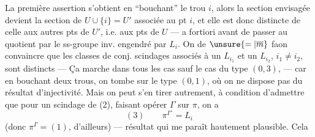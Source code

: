 La première assertion s'obtient en ``bouchant''
le trou $i$, alors la section envisagée devient
la section de $U\cup\{i\}=U'$ associée au pt $i$,
et elle est donc distincte de celle 
aux  autres pts de $U'$, i.e. aux pts de
$U$ --- a fortiori avant de passer au
quotient par le ss-groupe inv. engendré
par $L_i$. On  de $\unsure{=|\overline m}$ faon 
convaincre que les classes de conj. 
scindages associés à un $L_{i_1}$ et un $L_{i_2}$, $i_1\ne i_2$,
sont distincts --- Ça marche dans tous les
cas sauf le cas du type $(0,3)$, ---
car en bouchant deux trous, on tombe
sur le type $(0,1)$, où on ne dispose pas
du résultat d'injectivité. Mais on
peut s'en tirer autrement, à condition
d'admettre que pour un scindage de
(2), faisant opérer $\Gamma$ sur $\pi$, on a
\[
(3)\qquad\pi^{\Gamma^\circ}=L_i
\]
(donc $\pi^\Gamma=(1)$, d'ailleurs) --- résultat
qui me paraît hautement plausible. Cela

